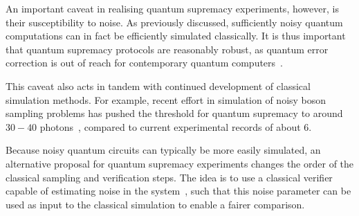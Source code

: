 An important caveat in realising quantum supremacy experiments, however, is their susceptibility to noise. As previously discussed, sufficiently noisy quantum computations can in fact be efficiently simulated classically. It is thus important that quantum supremacy protocols are reasonably robust, as quantum error correction is out of reach for contemporary quantum computers~\cite{Preskill2018}.\par
This caveat also acts in tandem with continued development of classical simulation methods. For example, recent effort in simulation of noisy boson sampling problems has pushed the threshold for quantum supremacy to around $30-40$ photons~\cite{Neville2017}, compared to current experimental records of about $6$.\par
Because noisy quantum circuits can typically be more easily simulated, an alternative proposal for quantum supremacy experiments changes the order of the classical sampling and verification steps. The idea is to use a classical verifier capable of estimating noise in the system~\cite{Villalonga2019}, such that this noise parameter can be used as input to the classical simulation to enable a fairer comparison.

